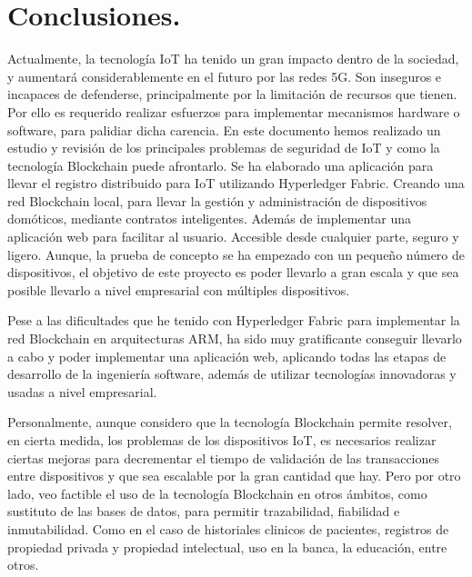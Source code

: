 \section{Conclusiones.}

Actualmente, la tecnología IoT ha tenido un gran impacto dentro de la sociedad, y aumentará considerablemente en el 
futuro por las redes 5G. Son inseguros e incapaces de defenderse, principalmente por la limitación de recursos que tienen. 
Por ello es requerido realizar esfuerzos para implementar mecanismos hardware o software, para palidiar dicha carencia. 
En este documento hemos realizado un estudio y revisión de los principales problemas de seguridad de IoT y como la 
tecnología Blockchain puede afrontarlo. Se ha elaborado una aplicación para llevar el registro distribuido para IoT 
utilizando Hyperledger Fabric. Creando una red Blockchain local, para llevar la gestión y administración de dispositivos 
domóticos, mediante contratos inteligentes. Además de implementar una aplicación web para facilitar al usuario. Accesible 
desde cualquier parte, seguro y ligero. Aunque, la prueba de concepto se ha empezado con un pequeño número de dispositivos,
el objetivo de este proyecto es poder llevarlo a gran escala y que sea posible llevarlo a nivel empresarial con múltiples
dispositivos.  

\vspace{5mm}

\noindent Pese a las dificultades que he tenido con Hyperledger Fabric para implementar la red Blockchain en arquitecturas 
ARM, ha sido muy gratificante conseguir llevarlo a cabo y poder implementar una aplicación web, aplicando todas las etapas 
de desarrollo de la ingeniería software, además de utilizar tecnologías innovadoras y usadas a nivel empresarial.

\vspace{5mm}

\noindent Personalmente, aunque considero que la tecnología Blockchain permite resolver, en cierta medida, los problemas 
de los dispositivos IoT, es necesarios realizar ciertas mejoras para decrementar el tiempo de validación de las 
transacciones entre dispositivos y que sea escalable por la gran cantidad que hay. Pero por otro lado, veo factible el uso 
de la tecnología Blockchain en otros ámbitos, como sustituto de las bases de datos, para permitir trazabilidad, fiabilidad 
e inmutabilidad. Como en el caso de historiales clinicos de pacientes, registros de propiedad privada y propiedad 
intelectual, uso en la banca, la educación, entre otros.


